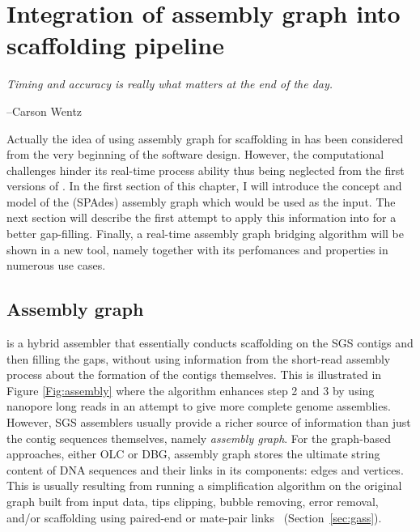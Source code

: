 \chapter{Integration of assembly graph into scaffolding pipeline}\label{ch:npgraph}
\thispagestyle{empty}
\vspace*{\fill}
\epigraph{\emph{Timing and accuracy is really what matters at the end of the day.}}
{--Carson Wentz}

\clearpage
Actually the idea of using assembly graph for scaffolding in \npscarf{} has been considered from the very beginning of the software design. However, the computational challenges hinder its real-time process ability thus being neglected from the first versions of \npscarf{}. In the first section of this chapter, I will introduce the concept and model of the (SPAdes) assembly graph  which would be used as the input. The next section will describe the first attempt to apply this information into \npscarf{} for a better gap-filling. Finally, a real-time assembly graph bridging algorithm will be shown in a new tool, namely \npgraph{} together with its perfomances and properties in numerous use cases.

\section{Assembly graph}
\npscarf{} is a hybrid assembler that essentially conducts scaffolding on the SGS contigs and then filling the gaps, without using information from the short-read assembly process about the formation of the contigs themselves. This is illustrated in Figure \ref{Fig:assembly} where the algorithm enhances step 2 and 3 by using nanopore long reads in an attempt to give more complete genome assemblies. 
However, SGS assemblers usually provide a richer source of information than just the contig sequences themselves, namely \emph{assembly graph}. 
For the graph-based approaches, either OLC or DBG, assembly graph stores the ultimate string content of DNA sequences and their links in its components: edges and vertices. 
This is usually resulting from running a simplification algorithm on the original graph built from input data, \EG{} tips clipping, bubble removing, error removal, and/or scaffolding using paired-end or mate-pair links~\cite{Zerbino2008,BankevichNA2012} (Section~\ref{sec:gass}).

